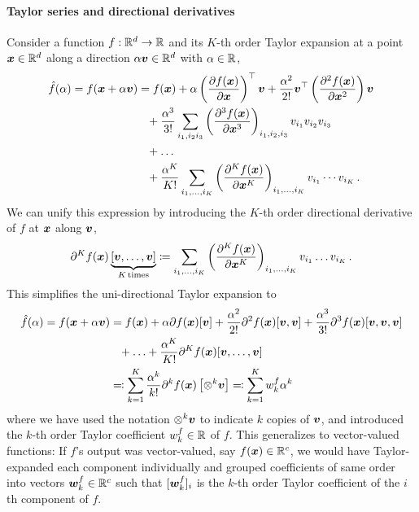 \paragraph{Taylor series and directional derivatives} Consider a function $f: {\mathbb{R}}^d \to {\mathbb{R}}$ and its $K$-th order Taylor expansion at a point ${\bm{x}} \in {\mathbb{R}}^d$ along a direction $\alpha {\bm{v}} \in {\mathbb{R}}^d$ with $\alpha \in {\mathbb{R}}$,
\begin{align*}
  \hat{f}(\alpha) =
  f({\bm{x}} + \alpha {\bm{v}})
  &=
    f({\bm{x}})
    +
    \alpha
    \left(
    \frac{\partial f({\bm{x}})}{\partial {\bm{x}}}
    \right)^{\top} {\bm{v}}
    +
    \frac{\alpha^2}{2!}
    {\bm{v}}^\top
    \left(
    \frac{\partial^2 f({\bm{x}})}{\partial {\bm{x}}^2}
    \right) {\bm{v}}
  \\
  &\phantom{=}+
    \frac{\alpha^3}{3!}
    \sum_{i_1, i_2 i_3}
    \left(
    \frac{\partial^3 f({\bm{x}})}{\partial{\bm{x}}^3}
    \right)_{i_1, i_2, i_3} {v}_{i_1} {v}_{i_2} {v}_{i_3}
  \\
  &\phantom{=}+
    \ldots
  \\
  &\phantom{=}+
    \frac{\alpha^K}{K!}
    \sum_{i_1, \dots, i_K}
    \left(
    \frac{\partial^K f({\bm{x}})}{\partial{\bm{x}}^K}
    \right)_{i_1, \dots, i_K} {v}_{i_1} \cdots {v}_{i_K}\,.
\end{align*}
We can unify this expression by introducing the $K$-th order directional derivative of $f$ at ${\bm{x}}$ along ${\bm{v}}$,
\begin{align*}
  \partial^K f({\bm{x}})
  \underbrace{\left[ {\bm{v}}, \ldots, {\bm{v}} \right]}_{K\,\text{times}}
  \coloneqq
  \sum_{i_1, \dots, i_K}
  \left(
  \frac{\partial^K f({\bm{x}})}{\partial{\bm{x}}^K}
  \right)_{i_1, \dots, i_K} {v}_{i_1} \dots {v}_{i_K}\,.
\end{align*}
This simplifies the uni-directional Taylor expansion to
\begin{align*}
  \hat{f}(\alpha) = f({\bm{x}} + \alpha{\bm{v}})
  &=
    f({\bm{x}})
    +
    \alpha
    \partial f({\bm{x}})[{\bm{v}}]
    +
    \frac{\alpha^2}{2!}
    \partial^2 f({\bm{x}})[{\bm{v}}, {\bm{v}}]
    +
    \frac{\alpha^3}{3!}
    \partial^3 f({\bm{x}})[{\bm{v}}, {\bm{v}}, {\bm{v}}]
  \\
  &\phantom{=}+
    \ldots
    +
    \frac{\alpha^K}{K!}
    \partial^K f({\bm{x}})[{\bm{v}}, \ldots, {\bm{v}}]
  \\
  &\eqqcolon
    \sum_{k=1}^K
    \frac{\alpha^k}{k!}
    \partial^k f({\bm{x}})\left[\otimes^k {\bm{v}}  \right]
    \eqqcolon
    \sum_{k=1}^K
    w^f_k \alpha^k
\end{align*}
where we have used the notation $\otimes^k {\bm{v}}$ to indicate $k$ copies of ${\bm{v}}$, and introduced the $k$-th order Taylor coefficient $w^f_k \in {\mathbb{R}}$ of $f$.
This generalizes to vector-valued functions:
If $f$'s output was vector-valued, say $f({\bm{x}}) \in {\mathbb{R}}^c$, we would have Taylor-expanded each component individually and grouped coefficients of same order into vectors ${\bm{w}}_k^f \in {\mathbb{R}}^c$ such that $[{\bm{w}}_k^f]_i$ is the $k$-th order Taylor coefficient of the $i$th component of $f$.

